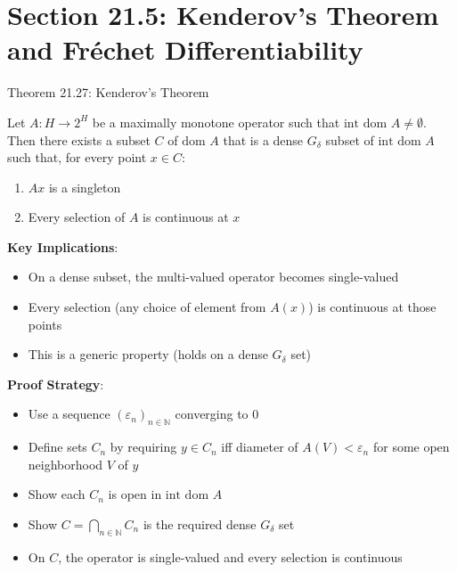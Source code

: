 \documentclass[aspectratio=169,10pt]{beamer}
\begin{document}
\section{Section 21.5: Kenderov's Theorem and Fréchet Differentiability}

\begin{frame}[allowframebreaks]{Theorem 21.27: Kenderov's Theorem}
    \begin{theorem}
        Let $A: H \to 2^H$ be a maximally monotone operator such that
        $\text{int dom } A \neq \emptyset$. Then there exists a subset $C$ of $\text{dom } A$
        that is a dense $G_\delta$ subset of $\text{int dom } A$ such that, for every point $x \in C$:

        \begin{enumerate}
            \item $Ax$ is a singleton
            \item Every selection of $A$ is continuous at $x$
        \end{enumerate}
    \end{theorem}

    \vspace{1em}
    \textbf{Key Implications}:
    \begin{itemize}
        \item On a dense subset, the multi-valued operator becomes single-valued
        \item Every selection (any choice of element from $A(x)$) is continuous at those points
        \item This is a generic property (holds on a dense $G_\delta$ set)
    \end{itemize}

    \pagebreak

    \textbf{Proof Strategy}:
    \begin{itemize}
        \item Use a sequence $(\varepsilon_n)_{n \in \mathbb{N}}$ converging to $0$
        \item Define sets $C_n$ by requiring $y \in C_n$ iff diameter of $A(V) < \varepsilon_n$
              for some open neighborhood $V$ of $y$
        \item Show each $C_n$ is open in $\text{int dom } A$
        \item Show $C = \bigcap_{n \in \mathbb{N}} C_n$ is the required dense $G_\delta$ set
        \item On $C$, the operator is single-valued and every selection is continuous
    \end{itemize}
\end{frame}
\end{document}
